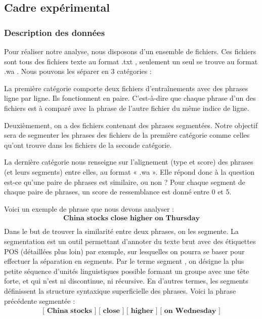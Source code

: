\documentclass[a4paper, twoside, 11pt]{article}
\begin{document}
    \subsection{Cadre expérimental}

        \subsubsection{Description des données}

 Pour réaliser notre analyse, nous disposons d’un ensemble de fichiers. Ces fichiers sont tous des fichiers texte au format \og .txt \fg{}, seulement un seul se trouve au format \og.wa \fg{}. Nous pouvons les séparer en 3 catégories :

La première catégorie comporte deux fichiers d’entraînements avec des phrases ligne par ligne. Ils fonctionnent en paire. C’est-à-dire que chaque phrase d’un des fichiers est à comparé avec la phrase de l’autre fichier du même indice de ligne.

Deuxièmement, on a des fichiers contenant des phrases segmentées. Notre objectif sera de segmenter les phrases des fichiers de la première catégorie comme celles qu'ont trouve dans les fichiers de la seconde catégorie.

La dernière catégorie nous renseigne sur l’alignement (type et score) des phrases (et leurs segments) entre elles, au format « .wa ». Elle répond donc à la question \og est-ce qu’une paire de phrases est similaire, ou non ? \fg{} Pour chaque segment de chaque paire de phrases, un score de ressemblance est donné entre 0 et 5.

Voici un exemple de phrase que nous devons analyser :
  \begin{eqnarray*}
\textbf{China stocks close higher on Thursday}\\
 \end{eqnarray*}
 Dans le but de trouver la similarité entre deux phrases, on les segmente. La segmentation est un outil permettant d'annoter du texte brut avec des étiquettes POS (détaillées plus loin) par exemple, sur lesquelles on pourra se baser pour effectuer la séparation en segments. Par le terme \og segment \fg{}, on désigne la plus petite séquence d'unités linguistiques possible formant un groupe avec une tête forte, et qui n'est ni discontinue, ni récursive. En d’autres termes, les segments définissent la structure syntaxique superficielle des phrases. Voici la phrase précédente segmentée :
  \begin{eqnarray*}
\textbf{[ China stocks ] [ close ] [ higher ] [ on Wednesday ]}\\
 \end{eqnarray*}
\end{document}
